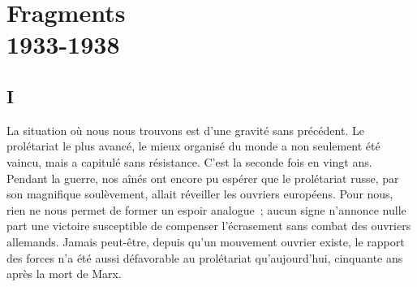 \documentclass[french,twoside]{book} %
\begin{document}
\section[{Fragments, 1933-1938}]{Fragments \\
1933-1938}\renewcommand{\leftmark}{Fragments \\
1933-1938}

\noindent \par
\subsection[{I}]{I}
\noindent La situation où nous nous trouvons est d'une gravité sans précédent. Le prolétariat le plus avancé, le mieux organisé du monde a non seulement été vaincu, mais a capitulé sans résistance. C'est la seconde fois en vingt ans. Pendant la guerre, nos aînés ont encore pu espérer que le prolétariat russe, par son magnifique soulèvement, allait réveiller les ouvriers européens. Pour nous, rien ne nous permet de former un espoir analogue ; aucun signe n'annonce nulle part une victoire susceptible de compenser l'écrasement sans combat des ouvriers allemands. Jamais peut-être, depuis qu'un mouvement ouvrier existe, le rapport des forces n'a été aussi défavorable au prolétariat qu'aujourd'hui, cinquante ans après la mort de Marx.\par
\end{document}
